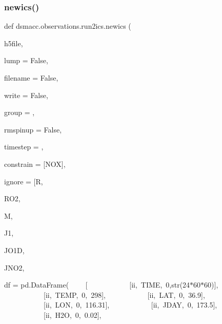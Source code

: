 \subsubsection{\texorpdfstring{newics()}{newics()}}
{\footnotesize\ttfamily def dsmacc.\+observations.\+run2ics.\+newics (\begin{DoxyParamCaption}\item[{}]{h5file,  }\item[{}]{lump = {\ttfamily False},  }\item[{}]{filename = {\ttfamily False},  }\item[{}]{write = {\ttfamily False},  }\item[{}]{group = {},  }\item[{}]{rmspinup = {\ttfamily False},  }\item[{}]{timestep = {},  }\item[{}]{constrain = {\ttfamily \mbox{[}\textquotesingle{}NOX\textquotesingle{}\mbox{]}},  }\item[{}]{ignore = {\ttfamily \mbox{[}\textquotesingle{}R\textquotesingle{}},  }\item[{}]{R\+O2,  }\item[{}]{M,  }\item[{}]{J1,  }\item[{}]{J\+O1D,  }\item[{}]{J\+N\+O2,  }\item[{}]{df = {\ttfamily pd.DataFrame(
~~~~\mbox{[}
~~~~~~~~~~~\mbox{[}\textquotesingle{}ii\textquotesingle{},~\textquotesingle{}TIME\textquotesingle{},~\textquotesingle{}0\textquotesingle{},str(24$\ast$60$\ast$60)\mbox{]},
~~~~~~~~~~~\mbox{[}\textquotesingle{}ii\textquotesingle{},~\textquotesingle{}TEMP\textquotesingle{},~\textquotesingle{}0\textquotesingle{},~\textquotesingle{}298\textquotesingle{}\mbox{]},
~~~~~~~~~~~\mbox{[}\textquotesingle{}ii\textquotesingle{},~\textquotesingle{}LAT\textquotesingle{},~\textquotesingle{}0\textquotesingle{},~\textquotesingle{}36.9\textquotesingle{}\mbox{]},
~~~~~~~~~~~\mbox{[}\textquotesingle{}ii\textquotesingle{},~\textquotesingle{}LON\textquotesingle{},~\textquotesingle{}0\textquotesingle{},~\textquotesingle{}116.31\textquotesingle{}\mbox{]},
~~~~~~~~~~~\mbox{[}\textquotesingle{}ii\textquotesingle{},~\textquotesingle{}JDAY\textquotesingle{},~\textquotesingle{}0\textquotesingle{},~\textquotesingle{}173.5\textquotesingle{}\mbox{]},
~~~~~~~~~~~\mbox{[}\textquotesingle{}ii\textquotesingle{},~\textquotesingle{}H2O\textquotesingle{},~\textquotesingle{}0\textquotesingle{},~\textquotesingle{}0.02\textquotesingle{}\mbox{]},
}}
\end{DoxyParamCaption}}
